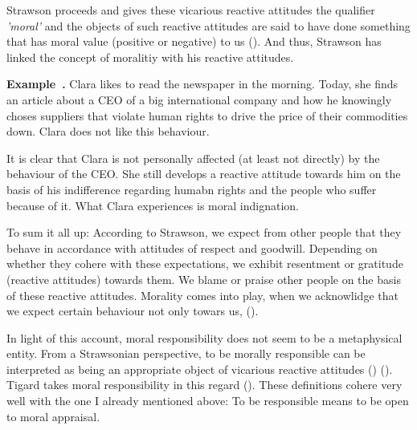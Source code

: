 \documentclass{article}
\newcounter{example}
\newenvironment{example}[1][]{\refstepcounter{example}\par\medskip
   \noindent \textbf{Example~\theexample. #1} \rmfamily}{\medskip}
\begin{document}
Strawson proceeds and gives these vicarious reactive attitudes the
qualifier \textit{'moral'} and the objects of such reactive attitudes are said
to have done something that has moral value (positive or negative) to us
(\cite[p.15]{Strawson1962}). And thus, Strawson has linked the concept of
moralitiy with his reactive attitudes.


\begin{example}
	Clara likes to read the newspaper in the morning. Today, she finds an
	article about a CEO of a big international company and how he knowingly
	choses suppliers that violate human rights to drive the price of their
	commodities down. Clara does not like this behaviour.
\end{example}


It is clear that Clara is not personally affected (at least not directly) by the
behaviour of the CEO. She still develops a reactive attitude towards him on the
basis of his indifference regarding humabn rights and the people who suffer
because of it. What Clara experiences is moral indignation.

To sum it all up: According to Strawson, we expect from other people that they
behave in accordance with attitudes of respect and goodwill. Depending on
whether they cohere with these expectations, we exhibit resentment or gratitude
(reactive attitudes) towards them. We blame or praise other people on the basis
of these reactive attitudes. Morality comes into play, when we acknowlidge that
we expect certain behaviour not only towars us,  (\cite[p.16]{Strawson1962}).

In light of this account, moral responsibility does not seem to be a metaphysical entity.
From a Strawsonian perspective, to be morally responsible can be interpreted as
being an appropriate object of vicarious reactive attitudes
(\cite[p.3]{SmithVickers2021}) (\cite[p.175]{Matthias_2004}). Tigard takes moral
responsibility in this regard  (\cite[p.3]{Tigard_2020}). 
These definitions cohere very well with the one I already mentioned above: To be
responsible means to be open to moral appraisal.



\end{document}
